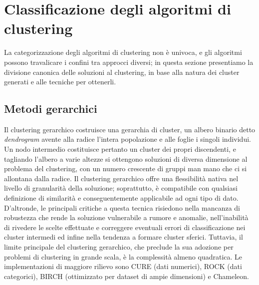 \section{Classificazione degli algoritmi di clustering}
\label{sec:classificazione_algoritmi}
La categorizzazione degli algoritmi di clustering non \`e univoca, e gli algoritmi possono travalicare i confini tra approcci diversi; in questa sezione presentiamo la divisione canonica delle soluzioni al clustering, in base alla natura dei cluster generati e alle tecniche per ottenerli.
\subsection{Metodi gerarchici}
Il clustering gerarchico costruisce una gerarchia di cluster, un albero binario detto \textit{dendrogram} avente alla radice l'intera popolazione e alle foglie i singoli individui. Un nodo intermedio costituisce pertanto un cluster dei propri discendenti, e tagliando l'albero a varie altezze si ottengono soluzioni di diversa dimensione al problema del clustering, con un numero crescente di gruppi man mano che ci si allontana dalla radice.
Il clustering gerarchico offre una flessibilit\`a nativa nel livello di granularit\`a della soluzione; soprattutto, \`e  compatibile con qualsiasi definizione di similarit\`a e conseguentemente applicabile ad ogni tipo di dato. D'altronde, le principali critiche a questa tecnica risiedono nella mancanza di robustezza che rende la soluzione vulnerabile a rumore e anomalie, nell'inabilit\`a di rivedere le scelte effettuate e correggere eventuali errori di classificazione nei cluster intermedi ed infine nella tendenza a formare cluster sferici. Tuttavia, il limite principale del clustering gerarchico, che preclude la sua adozione per problemi di clustering in grande scala, \`e la complessit\`a almeno quadratica. Le implementazioni di maggiore rilievo sono CURE (dati numerici), ROCK (dati categorici), BIRCH (ottimizzato per dataset di ampie dimensioni) e Chameleon.
